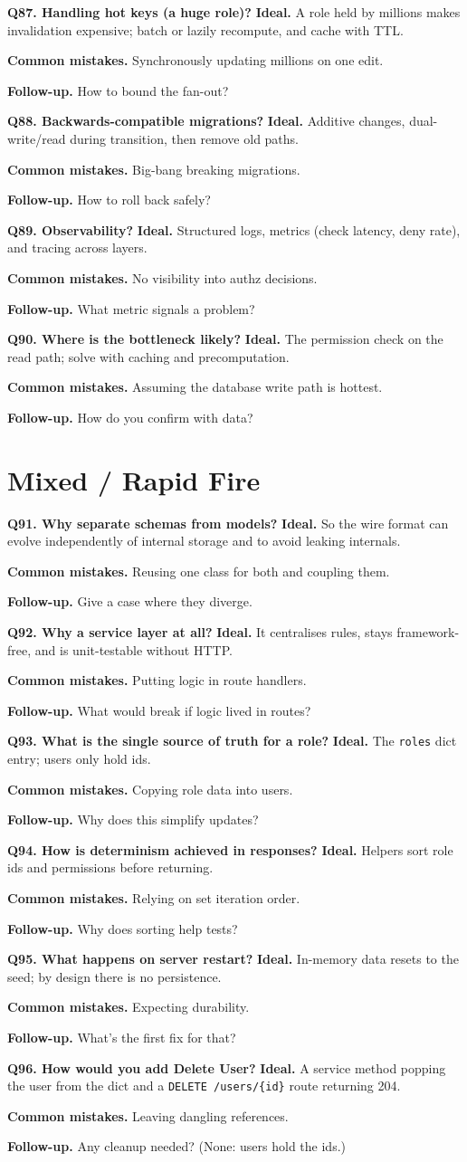 \documentclass[11pt,a4paper]{report}
\newcommand{\qa}[3]{%
  \textbf{Ideal.} #1\par
  \textbf{Common mistakes.} #2\par
  \textbf{Follow-up.} #3\par
  \vspace{4pt}
}
\begin{document}
\textbf{Q87. Handling hot keys (a huge role)?}
\qa{A role held by millions makes invalidation expensive; batch or lazily
recompute, and cache with TTL.}
{Synchronously updating millions on one edit.}
{How to bound the fan-out?}

\textbf{Q88. Backwards-compatible migrations?}
\qa{Additive changes, dual-write/read during transition, then remove old paths.}
{Big-bang breaking migrations.}
{How to roll back safely?}

\textbf{Q89. Observability?}
\qa{Structured logs, metrics (check latency, deny rate), and tracing across
layers.}
{No visibility into authz decisions.}
{What metric signals a problem?}

\textbf{Q90. Where is the bottleneck likely?}
\qa{The permission check on the read path; solve with caching and precomputation.}
{Assuming the database write path is hottest.}
{How do you confirm with data?}

\section{Mixed / Rapid Fire}

\textbf{Q91. Why separate schemas from models?}
\qa{So the wire format can evolve independently of internal storage and to avoid
leaking internals.}
{Reusing one class for both and coupling them.}
{Give a case where they diverge.}

\textbf{Q92. Why a service layer at all?}
\qa{It centralises rules, stays framework-free, and is unit-testable without
HTTP.}
{Putting logic in route handlers.}
{What would break if logic lived in routes?}

\textbf{Q93. What is the single source of truth for a role?}
\qa{The \texttt{roles} dict entry; users only hold ids.}
{Copying role data into users.}
{Why does this simplify updates?}

\textbf{Q94. How is determinism achieved in responses?}
\qa{Helpers sort role ids and permissions before returning.}
{Relying on set iteration order.}
{Why does sorting help tests?}

\textbf{Q95. What happens on server restart?}
\qa{In-memory data resets to the seed; by design there is no persistence.}
{Expecting durability.}
{What's the first fix for that?}

\textbf{Q96. How would you add Delete User?}
\qa{A service method popping the user from the dict and a \texttt{DELETE /users/\{id\}}
route returning 204.}
{Leaving dangling references.}
{Any cleanup needed? (None: users hold the ids.)}
\end{document}
